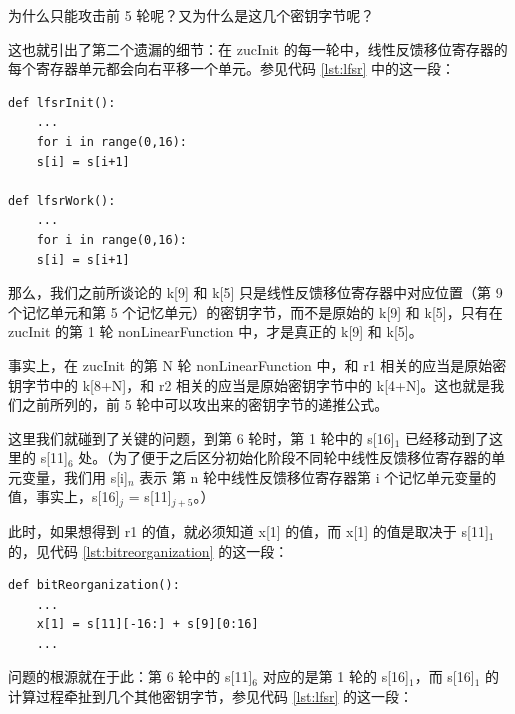 为什么只能攻击前 5 轮呢？又为什么是这几个密钥字节呢？

\vspace*{0.5\baselineskip}

这也就引出了第二个遗漏的细节：在 {\cnsls zucInit} 的每一轮中，线性反馈移位寄存器的每个寄存器单元都会向右平移一个单元。参见代码 \ref{lst:lfsr} 中的这一段：

\begin{lstlisting}[style=myPython]
def lfsrInit():
    ...
    for i in range(0,16):
    s[i] = s[i+1]

def lfsrWork():
    ...
    for i in range(0,16):
    s[i] = s[i+1]
\end{lstlisting}

\newpage

那么，我们之前所谈论的 {\cnsls k[9]} 和 {\cnsls k[5]} 只是线性反馈移位寄存器中对应位置（第 9 个记忆单元和第 5 个记忆单元）的密钥字节，而不是原始的 {\cnsls k[9]} 和 {\cnsls k[5]}，只有在 {\cnsls zucInit} 的第 1 轮 {\cnsls nonLinearFunction} 中，才是真正的 {\cnsls k[9]} 和 {\cnsls k[5]}。

事实上，在 {\cnsls zucInit} 的第 N 轮 {\cnsls nonLinearFunction} 中，和 {\cnsls r1} 相关的应当是原始密钥字节中的 {\cnsls k[8+N]}，和  {\cnsls r2} 相关的应当是原始密钥字节中的 {\cnsls k[4+N]}。这也就是我们之前所列的，前 5 轮中可以攻出来的密钥字节的递推公式。

这里我们就碰到了关键的问题，到第 6 轮时，第 1 轮中的 {\cnsls s[16]$_1$} 已经移动到了这里的 {\cnsls s[11]$_6$} 处。（为了便于之后区分初始化阶段不同轮中线性反馈移位寄存器的单元变量，我们用 {\color{blue} {\cnsls s[i]$_n$}} 表示 {\color{blue} 第 {\cnsls n} 轮中线性反馈移位寄存器第 {\cnsls i} 个记忆单元变量的值}，事实上，{\cnsls s[16]$_j$} = {\cnsls s[11]$_{j+5}$}。）

此时，如果想得到 {\cnsls r1} 的值，就必须知道 {\cnsls x[1]} 的值，而 {\cnsls x[1]} 的值是取决于 {\cnsls s[11]$_1$} 的，见代码 \ref{lst:bitreorganization} 的这一段：

\begin{lstlisting}[style=myPython]
def bitReorganization():
    ...
    x[1] = s[11][-16:] + s[9][0:16]
    ...
\end{lstlisting}

\vspace*{0.5\baselineskip}

问题的根源就在于此：第 6 轮中的 {\cnsls s[11]$_6$} 对应的是第 1 轮的 {\cnsls s[16]$_1$}，而 {\cnsls s[16]$_1$} 的计算过程牵扯到几个其他密钥字节，参见代码 \ref{lst:lfsr} 的这一段：

